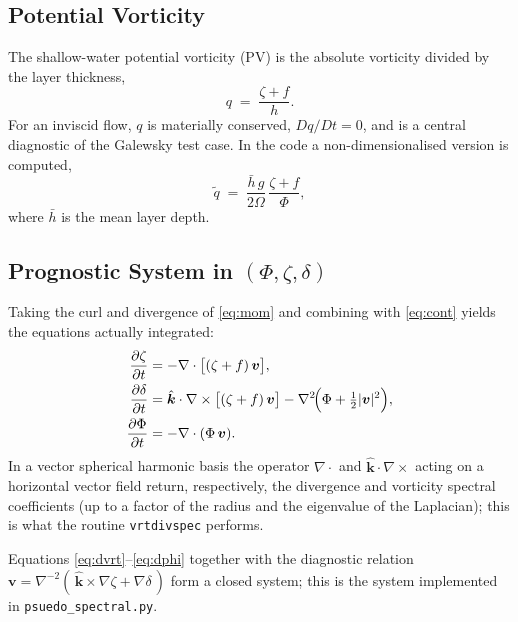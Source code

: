 \documentclass[11pt]{article}
\newcommand{\bvec}[1]{\boldsymbol{#1}}
\begin{document}
\subsection*{Potential Vorticity}

The shallow-water potential vorticity (PV) is the absolute vorticity
divided by the layer thickness,
\begin{equation}
    q \;=\; \frac{\zeta + f}{h}.
\end{equation}
For an inviscid flow, $q$ is materially conserved,
$Dq/Dt = 0$, and is a central diagnostic of the Galewsky test case.
In the code a non-dimensionalised version is computed,
\begin{equation}
    \tilde q \;=\; \frac{\bar h\, g}{2\Omega}\,
        \frac{\zeta + f}{\Phi},
    \label{eq:pv_code}
\end{equation}
where $\bar h$ is the mean layer depth.

\subsection*{Prognostic System in $(\Phi,\zeta,\delta)$}

Taking the curl and divergence of \eqref{eq:mom} and combining with
\eqref{eq:cont} yields the equations actually integrated:
\begin{align}
    \frac{\partial \zeta}{\partial t}
        &= -\nabla\cdot\bigl[(\zeta + f)\,\bvec{v}\bigr],
        \label{eq:dvrt}\\
    \frac{\partial \delta}{\partial t}
        &=  \hat{\bvec{k}}\cdot\nabla\times\bigl[(\zeta+f)\,\bvec{v}\bigr]
            - \nabla^{2}\!\Bigl(\Phi + \tfrac{1}{2}|\bvec{v}|^{2}\Bigr),
        \label{eq:ddiv}\\
    \frac{\partial \Phi}{\partial t}
        &= -\nabla\cdot(\Phi\,\bvec{v}). \label{eq:dphi}
\end{align}
In a vector spherical harmonic basis the operator $\nabla\cdot$ and
$\hat{\bvec{k}}\cdot\nabla\times$ acting on a horizontal vector field
return, respectively, the divergence and vorticity spectral
coefficients (up to a factor of the radius and the eigenvalue of the
Laplacian); this is what the routine \texttt{vrtdivspec} performs.

Equations \eqref{eq:dvrt}--\eqref{eq:dphi} together with the
diagnostic relation $\bvec{v} = \nabla^{-2}(\,\hat{\bvec{k}}\times
\nabla\zeta + \nabla\delta\,)$ form a closed system; this is the
system implemented in \texttt{psuedo\_spectral.py}.
\end{document}
